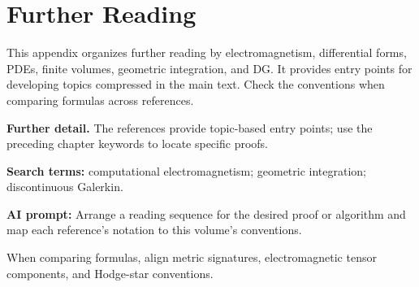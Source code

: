 \documentclass[11pt,openany]{book}
\numberwithin{equation}{chapter}
\theoremstyle{definition}
\theoremstyle{remark}
\newcommand{\studyroute}[3]{%
  \par\smallskip\noindent\textbf{Further detail.} #1\par
  \begingroup\raggedright\noindent\textbf{Search terms:} #2.\par\endgroup
  \noindent\textbf{AI prompt:} #3\par
}
\begin{document}
\chapter{Further Reading}
\begin{chaptersummary}
This appendix organizes further reading by electromagnetism, differential forms, PDEs, finite volumes, geometric integration, and DG.
It provides entry points for developing topics compressed in the main text.
Check the conventions when comparing formulas across references.
\end{chaptersummary}
\studyroute{The references provide topic-based entry points; use the preceding chapter keywords to locate specific proofs.}{computational electromagnetism; geometric integration; discontinuous Galerkin}{Arrange a reading sequence for the desired proof or algorithm and map each reference's notation to this volume's conventions.}
When comparing formulas, align metric signatures, electromagnetic tensor components, and Hodge-star conventions.
\end{document}
